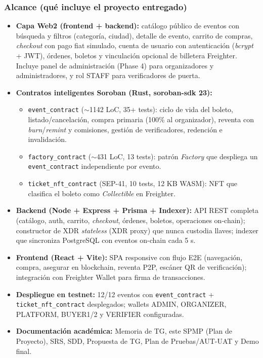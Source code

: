\documentclass[12pt,oneside]{report}
\begin{document}
      \subsubsection*{Alcance (qué incluye el proyecto entregado)}
      \begin{itemize}
        \item \textbf{Capa Web2 (frontend + backend):} catálogo público de eventos con búsqueda y filtros (categoría, ciudad), detalle de evento, carrito de compras, \textit{checkout} con pago fiat simulado, cuenta de usuario con autenticación (\textit{bcrypt} + JWT), órdenes, boletos y vinculación opcional de billetera Freighter. Incluye panel de administración (Phase 4) para organizadores y administradores, y rol STAFF para verificadores de puerta.
        \item \textbf{Contratos inteligentes Soroban (Rust, soroban-sdk 23):}
        \begin{itemize}
          \item \texttt{event\_contract} ($\sim$1142 LoC, 35+ tests): ciclo de vida del boleto, listado/cancelación, compra primaria (100\% al organizador), reventa con \textit{burn}/\textit{remint} y comisiones, gestión de verificadores, redención e invalidación.
          \item \texttt{factory\_contract} ($\sim$431 LoC, 13 tests): patrón \textit{Factory} que despliega un \texttt{event\_contract} independiente por evento.
          \item \texttt{ticket\_nft\_contract} (SEP-41, 10 tests, 12 KB WASM): NFT que clasifica el boleto como \textit{Collectible} en Freighter.
        \end{itemize}
        \item \textbf{Backend (Node + Express + Prisma + Indexer):} API REST completa (catálogo, auth, carrito, \textit{checkout}, órdenes, boletos, operaciones on-chain); constructor de XDR \textit{stateless} (XDR proxy) que nunca custodia llaves; indexer que sincroniza PostgreSQL con eventos on-chain cada 5 s.
        \item \textbf{Frontend (React + Vite):} SPA responsive con flujo E2E (navegación, compra, asegurar en blockchain, reventa P2P, escáner QR de verificación); integración con Freighter Wallet para firma de transacciones.
        \item \textbf{Despliegue en testnet:} 12/12 eventos con \texttt{event\_contract} + \texttt{ticket\_nft\_contract} desplegados; wallets ADMIN, ORGANIZER, PLATFORM, BUYER1/2 y VERIFIER configuradas.
        \item \textbf{Documentación académica:} Memoria de TG, este SPMP (Plan de Proyecto), SRS, SDD, Propuesta de TG, Plan de Pruebas/AUT-UAT y Demo final.
      \end{itemize}
\end{document}
